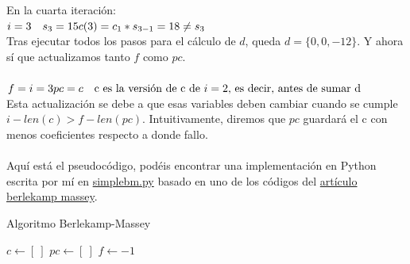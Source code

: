\\\\
En la cuarta iteración: \\
\(i=3 \quad s_3 = 15 \\
c(3) = c_1 * s_{3-1} = 18 \neq s_3\\
\)\\
Tras ejecutar todos los pasos para el cálculo de $d$, queda $d = \{ 0, 0, -12\}$. Y ahora sí que actualizamos tanto $f$ como $pc$.\\\\
\(f = i = 3 \\
pc = c \quad \text{c es la versión de c de $i=2$, es decir, antes de sumar d}\\
\)\\
Esta actualización se debe a que esas variables deben cambiar cuando se cumple $i - len(c) > f - len(pc)$. Intuitivamente, diremos que $pc$ guardará el c con menos coeficientes respecto a donde fallo. \\\\%
Aquí está el pseudocódigo, podéis encontrar una implementación en Python escrita por mí en \href{https://github.com/domingoUnican/TFGPedroCastro/blob/main/code/code_proofs/simple_berlekamp_massey.py}{simplebm.py} basado en uno de los códigos del \href{https://mzhang2021.github.io/cp-blog/berlekamp-massey/}{artículo berlekamp massey}.



\begin{algorithm}
\caption{Algoritmo Berlekamp-Massey}\label{alg:two}
$c \gets [ \ ]$\;
$pc \gets [ \ ]$\;
$f \gets -1$\;
\end{algorithm}





